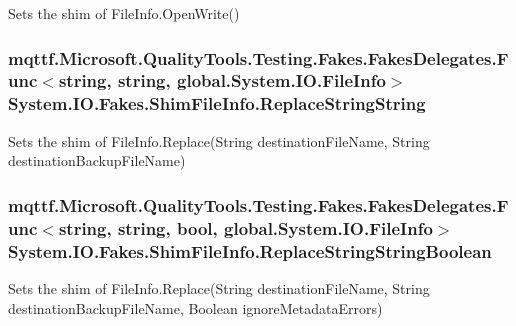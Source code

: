 Sets the shim of File\-Info.\-Open\-Write()

\hypertarget{class_system_1_1_i_o_1_1_fakes_1_1_shim_file_info_a05fd51d578a82665c791b10432a80f15}{
\subsubsection[{Replace\-String\-String}]{\setlength{\rightskip}{0pt plus 5cm}mqttf.\-Microsoft.\-Quality\-Tools.\-Testing.\-Fakes.\-Fakes\-Delegates.\-Func$<$string, string, global.\-System.\-I\-O.\-File\-Info$>$ System.\-I\-O.\-Fakes.\-Shim\-File\-Info.\-Replace\-String\-String\hspace{0.3cm}{\ttfamily [set]}}}\label{class_system_1_1_i_o_1_1_fakes_1_1_shim_file_info_a05fd51d578a82665c791b10432a80f15}


Sets the shim of File\-Info.\-Replace(\-String destination\-File\-Name, String destination\-Backup\-File\-Name)

\hypertarget{class_system_1_1_i_o_1_1_fakes_1_1_shim_file_info_ab0d67c7ffd5326972a106c59588336d5}{
\subsubsection[{Replace\-String\-String\-Boolean}]{\setlength{\rightskip}{0pt plus 5cm}mqttf.\-Microsoft.\-Quality\-Tools.\-Testing.\-Fakes.\-Fakes\-Delegates.\-Func$<$string, string, bool, global.\-System.\-I\-O.\-File\-Info$>$ System.\-I\-O.\-Fakes.\-Shim\-File\-Info.\-Replace\-String\-String\-Boolean\hspace{0.3cm}{\ttfamily [set]}}}\label{class_system_1_1_i_o_1_1_fakes_1_1_shim_file_info_ab0d67c7ffd5326972a106c59588336d5}


Sets the shim of File\-Info.\-Replace(\-String destination\-File\-Name, String destination\-Backup\-File\-Name, Boolean ignore\-Metadata\-Errors)

